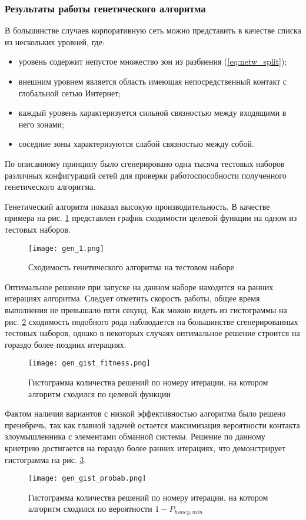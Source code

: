 \subsubsection{Результаты работы генетического алгоритма}\hspace*{\fill}

В большинстве случаев корпоративную сеть можно представить в качестве списка из нескольких уровней, где:
\begin{itemize}
	\item уровень содержит непустое множество зон из разбиения (\ref{eq:netw_split});
	\item внешним уровнем является область имеющая непосредственный контакт с глобальной сетью Интернет;
	\item каждый уровень характеризуется сильной связностью между входящими в него зонами;
	\item соседние зоны характеризуются слабой связностью между собой. 
\end{itemize}

По описанному принципу было сгенерировано  одна тысяча тестовых наборов различных конфигураций сетей для проверки работоспособности полученного генетического алгоритма.

Генетический алгоритм показал высокую производительность. В качестве примера на рис. \ref{fig:gen_1} представлен график сходимости целевой функции на одном из тестовых наборов.

\begin{figure}[ht]
\centering
	\texttt{[image: gen\_1.png]}  
	\caption{Сходимость генетического алгоритма на тестовом наборе}
	\label{fig:gen_1}
\end{figure}

Оптимальное решение при запуске на данном наборе находится на ранних итерациях алгоритма. Следует отметить скорость работы, общее время выполнения не превышало пяти секунд. Как можно видеть из гистограммы на рис. \ref{fig:gen_gist_fitness} сходимость подобного рода наблюдается на большинстве сгенерированных тестовых наборов, однако в некоторых случаях оптимальное решение строится на гораздо более поздних итерациях. 

\begin{figure}[!htbp]
\centering
	\texttt{[image: gen\_gist\_fitness.png]}  
	\caption{Гистограмма количества решений по номеру итерации, на котором алгоритм сходился по целевой функции}
	\label{fig:gen_gist_fitness}
\end{figure}

Фактом наличия вариантов с низкой эффективностью алгоритма было решено пренебречь, так как главной задачей остается максимизация вероятности контакта злоумышленника с элементами обманной системы. Решение по данному криетрию достигается на гораздо более ранних итерациях, что демонстрирует гистограмма на рис. \ref{fig:gen_gist_probab}.

\begin{figure}[ht]
\centering
	\texttt{[image: gen\_gist\_probab.png]}  
	\caption{Гистограмма количества решений по номеру итерации, на котором алгоритм сходился по вероятности $1 - P_{honey, min}$}
	\label{fig:gen_gist_probab}
\end{figure}